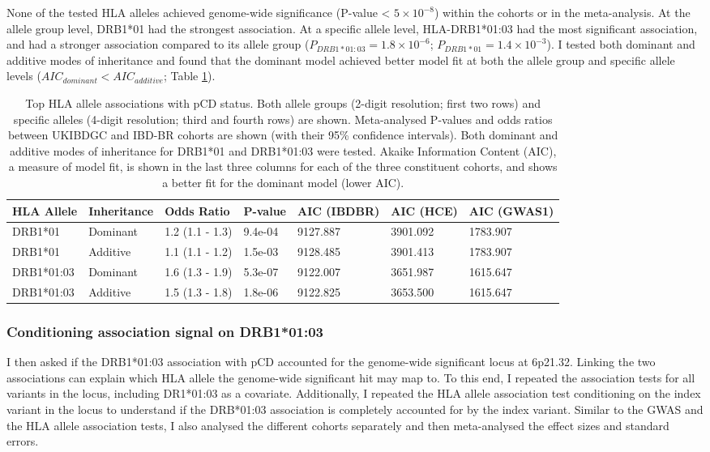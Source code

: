 None of the tested HLA alleles achieved genome-wide significance (P-value < $5\times10^{-8}$) within the cohorts or in the meta-analysis. At the allele group level, DRB1*01 had the strongest association. At a specific allele level, HLA-DRB1*01:03 had the most significant association, and had a stronger association compared to its allele group ($P_{DRB1*01:03}=1.8\times10^{-6}$; $P_{DRB1*01}=1.4\times10^{-3}$). I tested both dominant and additive modes of inheritance and found that the dominant model achieved better model fit at both the allele group and specific allele levels ($AIC_{dominant} < AIC_{additive}$; Table \ref{table:hla_allele_assoc}). 
\begin{table}[H]
  
  \centering\begingroup\fontsize{9}{10}\selectfont
  \caption[HLA alleles with strongest association with pCD]{Top HLA allele associations with pCD status. Both allele groups (2-digit resolution; first two rows) and specific alleles (4-digit resolution; third and fourth rows) are shown. Meta-analysed P-values and odds ratios between UKIBDGC and IBD-BR cohorts are shown (with their 95\% confidence intervals). Both dominant and additive modes of inheritance  for  DRB1*01 and DRB1*01:03 were tested. Akaike Information Content (AIC), a measure of model fit, is shown in the last three columns for each of the three constituent cohorts, and shows a better fit for the dominant model (lower AIC).}
  \label{table:hla_allele_assoc}
  \begin{tabular}[t]{|l|l|l|l|l|l|l|}
  \hline
  HLA Allele & Inheritance & Odds Ratio & P-value & AIC (IBDBR) & AIC (HCE) & AIC (GWAS1)\\
  \hline
  DRB1*01 & Dominant & 1.2 (1.1 - 1.3) & 9.4e-04 & 9127.887 & 3901.092 & 1783.907\\
  \hline
  DRB1*01 & Additive & 1.1 (1.1 - 1.2) & 1.5e-03 & 9128.485 & 3901.413 & 1783.907\\
  \hline
  DRB1*01:03 & Dominant & 1.6 (1.3 - 1.9) & 5.3e-07 & 9122.007 & 3651.987 & 1615.647\\
\hline
DRB1*01:03 & Additive & 1.5 (1.3 - 1.8) & 1.8e-06 & 9122.825 & 3653.500 & 1615.647\\
\hline
  \end{tabular}
  \endgroup{}
  \end{table}
\subsubsection{Conditioning association signal on DRB1*01:03}
I then asked if the DRB1*01:03 association with pCD accounted for the genome-wide significant locus at 6p21.32. Linking the two associations can explain which HLA allele the genome-wide significant hit may map to. To this end, I repeated the association tests for all variants in the locus, including DR1*01:03 as a covariate. Additionally, I repeated the HLA allele association test conditioning on the index variant in the locus to understand if the DRB*01:03 association is completely accounted for by the index variant. Similar to the GWAS and the HLA allele association tests, I also analysed the different cohorts separately and then meta-analysed the effect sizes and standard errors.\\


